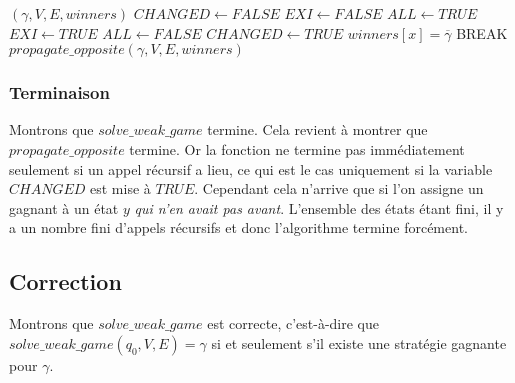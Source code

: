 \documentclass[10pt,a4paper]{article}
\begin{document}
\begin{algorithm}
\caption{$propagate\_opposite$}

\begin{algorithmic}[1]
	\REQUIRE $(\gamma, V, E, winners)$
	\STATE $CHANGED \leftarrow FALSE$
			\STATE $EXI \leftarrow FALSE$
			\STATE $ALL \leftarrow TRUE$
					\STATE $EXI \leftarrow TRUE$
				\ELSE
					\STATE $ALL \leftarrow FALSE$
				\ENDIF
			\ENDFOR
				\STATE $CHANGED \leftarrow TRUE$
				\STATE $winners[x] = \overline{\gamma}$
				\STATE BREAK 
			\ENDIF
		\ENDIF
	\ENDFOR
		\STATE $propagate\_opposite(\gamma, V, E, winners)$
	\ENDIF
	\RETURN
\end{algorithmic}
\end{algorithm}

\subsubsection{Terminaison}
Montrons que $solve\_weak\_game$ termine. Cela revient à montrer que $propagate\_opposite$ termine. Or la fonction ne termine pas immédiatement seulement si un appel récursif a lieu, ce qui est le cas uniquement si la variable $CHANGED$ est mise à $TRUE$. Cependant cela n'arrive que si l'on assigne un gagnant à un état $y$ \emph{qui n'en avait pas avant}. L'ensemble des états étant fini, il y a un nombre fini d'appels récursifs et donc l'algorithme termine forcément.

\subsection{Correction}
Montrons que $solve\_weak\_game$ est correcte, c'est-à-dire que $solve\_weak\_game(q_0,V,E) = \gamma$ si et seulement s'il existe une stratégie gagnante pour $\gamma$.
\end{document}
